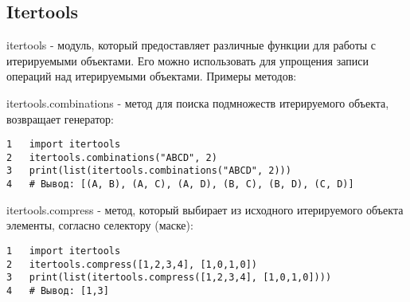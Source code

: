 \documentclass[12pt, a4paper]{article}
\begin{document}
\subsection{Itertools}

itertools - модуль, который предоставляет различные функции 
для работы с итерируемыми объектами. Его можно использовать
для упрощения записи операций над итерируемыми объектами.
Примеры методов:

\vspace{1em}

itertools.combinations - метод для поиска подмножеств
итерируемого объекта, возвращает генератор: 
\begin{verbatim}
1   import itertools    
2   itertools.combinations("ABCD", 2)
3   print(list(itertools.combinations("ABCD", 2)))
4   # Вывод: [(A, B), (A, C), (A, D), (B, C), (B, D), (C, D)]
\end{verbatim}

\vspace{1em}

itertools.compress - метод, который выбирает из исходного
итерируемого объекта элементы, согласно селектору (маске):
\begin{verbatim}
1   import itertools    
2   itertools.compress([1,2,3,4], [1,0,1,0])
3   print(list(itertools.compress([1,2,3,4], [1,0,1,0])))
4   # Вывод: [1,3]
\end{verbatim}
    
\vspace{1em}
\end{document}
